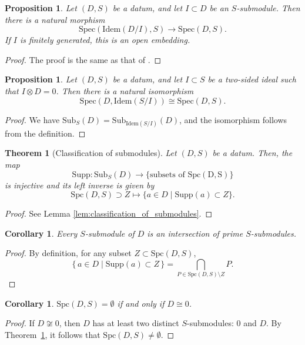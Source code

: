 \documentclass[11pt]{amsart}
\theoremstyle{definition}
\theoremstyle{plain}
\newtheorem{thm}[defn]{Theorem}
\newtheorem{prop}[defn]{Proposition}
\newtheorem{cor}[defn]{Corollary}
\theoremstyle{remark}
\newcommand{\Idem}{\mathrm{Idem}}
\newcommand{\Spec}{\mathrm{Spec}}
\newcommand{\Sub}{\mathrm{Sub}}
\newcommand{\mo}{\mathrm}
\newcommand{\Supp}{\mathrm{Supp}}
\newcommand{\Spc}{\mathrm{Spc}}
\numberwithin{equation}{section}
\begin{document}
\begin{prop}\label{prop:open_embedding}
Let \((D,S)\) be a datum, and let \(I\subset D\) be an \(S\)-submodule.
Then there is a natural morphism
\[
\Spec(\Idem(D/I),S)\longrightarrow \Spec(D,S).
\]
If \(I\) is finitely generated, this is an open embedding.
\end{prop}
\begin{proof}
The proof is the same as that of \cite[Propositions~4.2 and 4.3]{Ma2}.
\end{proof}

\begin{prop}
  Let \((D,S)\) be a datum, and let \(I\subset S\) be a two-sided ideal such that \(I\otimes D=0\).
  Then there is a natural isomorphism
  \[
  \Spec(D,\Idem(S/I))\cong \Spec(D,S).
  \]
\end{prop}
\begin{proof}
We have \(\Sub_S(D)=\Sub_{\Idem(S/I)}(D)\), and the isomorphism follows from the definition.
\end{proof}

\begin{thm}[Classification of submodules]\label{thm:classification_of_submodules} Let \((D,S)\) be a datum. Then, the map 
  \[\Supp:\Sub_S(D)\to \{\text{subsets of }\mo{\Spc(D,S)}\}\]
  is injective and its left inverse is given by
  \[\Spc(D,S)\supset Z\mapsto \{a\in D\mid \Supp(a)\subset Z\}.\]
\end{thm}
  \begin{proof} See Lemma \ref{lem:classification_of_submodules}. \end{proof}

\begin{cor}
Every \(S\)-submodule of \(D\) is an intersection of prime \(S\)-submodules.
\end{cor}
\begin{proof}
By definition, for any subset \(Z \subset \Spc(D,S)\),
\[
\{\,a \in D \mid \Supp(a) \subset Z \,\}
= \bigcap_{P \in \Spc(D,S)\setminus Z} P.
\]
\end{proof}

\begin{cor}\label{cor:empty_spectrum}
\(\Spc(D,S)=\emptyset\) if and only if \(D\cong 0\).
\end{cor}
\begin{proof}
  If \(D\not\cong 0\), then \(D\) has at least two distinct \(S\)-submodules: \(0\) and \(D\).
  By Theorem~\ref{thm:classification_of_submodules}, it follows that \(\Spc(D,S)\neq \emptyset\).
\end{proof}
\end{document}
